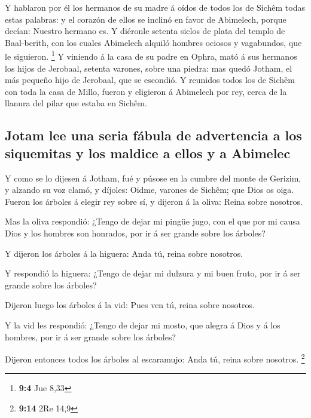  Y hablaron por él los hermanos de su madre á oídos de
todos los de Sichêm todas estas palabras: y el corazón de ellos se
inclinó en favor de Abimelech, porque decían: Nuestro hermano es.
 Y diéronle setenta siclos de plata del templo de
Baal-berith, con los cuales Abimelech alquiló hombres ociosos y
vagabundos, que le siguieron. \footnote{\textbf{9:4} Jue 8,33}
 Y viniendo á la casa de su padre en Ophra, mató á sus
hermanos los hijos de Jerobaal, setenta varones, sobre una piedra: mas
quedó Jotham, el más pequeño hijo de Jerobaal, que se escondió.
 Y reunidos todos los de Sichêm con toda la casa de Millo,
fueron y eligieron á Abimelech por rey, cerca de la llanura del pilar
que estaba en Sichêm.

\hypertarget{jotam-lee-una-seria-fuxe1bula-de-advertencia-a-los-siquemitas-y-los-maldice-a-ellos-y-a-abimelec}{%
\subsection{Jotam lee una seria fábula de advertencia a los siquemitas y
los maldice a ellos y a
Abimelec}\label{jotam-lee-una-seria-fuxe1bula-de-advertencia-a-los-siquemitas-y-los-maldice-a-ellos-y-a-abimelec}}

 Y como se lo dijesen á Jotham, fué y púsose en la cumbre
del monte de Gerizim, y alzando su voz clamó, y díjoles: Oidme, varones
de Sichêm; que Dios os oiga.  Fueron los árboles á elegir
rey sobre sí, y dijeron á la oliva: Reina sobre nosotros.

 Mas la oliva respondió: ¿Tengo de dejar mi pingüe jugo,
con el que por mi causa Dios y los hombres son honrados, por ir á ser
grande sobre los árboles?

 Y dijeron los árboles á la higuera: Anda tú, reina sobre
nosotros.

 Y respondió la higuera: ¿Tengo de dejar mi dulzura y mi
buen fruto, por ir á ser grande sobre los árboles?

 Dijeron luego los árboles á la vid: Pues ven tú, reina
sobre nosotros.

 Y la vid les respondió: ¿Tengo de dejar mi mosto, que
alegra á Dios y á los hombres, por ir á ser grande sobre los árboles?

 Dijeron entonces todos los árboles al escaramujo: Anda
tú, reina sobre nosotros. \footnote{\textbf{9:14} 2Re 14,9}

